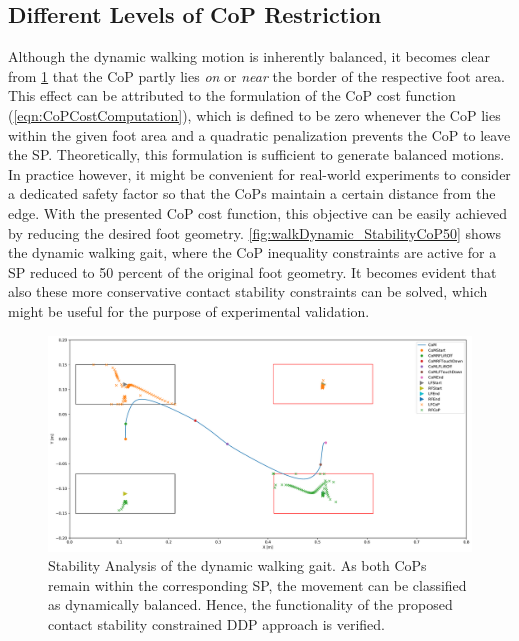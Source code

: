 \subsection{Different Levels of CoP Restriction}
Although the dynamic walking motion is inherently balanced, it becomes clear from \cref{fig:walkDynamic_StabilityCoP100} that the \gls{CoP} partly lies \textit{on} or \textit{near} the border of the respective foot area. This effect can be attributed to the formulation of the \gls{CoP} cost function (\cref{eqn:CoPCostComputation}), which is defined to be zero whenever the \gls{CoP} lies within the given foot area and a quadratic penalization prevents the \gls{CoP} to leave the \gls{SP}. 
Theoretically, this formulation is sufficient to generate balanced motions. 
In practice however, it might be convenient for real-world experiments to consider a dedicated safety factor so that the \gls{CoP}s maintain a certain distance from the edge. With the presented \gls{CoP} cost function, this objective can be easily achieved by reducing the desired foot geometry. 
\cref{fig:walkDynamic_StabilityCoP50} shows the dynamic walking gait, where the \gls{CoP} inequality constraints are active for a \gls{SP} reduced to 50 percent of the original foot geometry. It becomes evident that also these more conservative contact stability constraints can be solved, which might be useful for the purpose of experimental validation. 

\begin{figure}[h!]
\centering	
\includegraphics[width=.9\textwidth]{fig/walkDynamic/StabilityAnalysis_CoP100}
\caption[Stability Analysis of the dynamic walking gait]{Stability Analysis of the dynamic walking gait. As both \gls{CoP}s remain within the corresponding SP, the movement can be classified as dynamically balanced. Hence, the functionality of the proposed contact stability constrained \gls{DDP} approach is verified.}
\label{fig:walkDynamic_StabilityCoP100}
\end{figure} 

